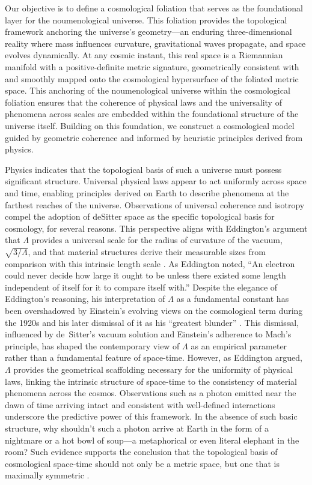 \documentclass[aps,rmp,groupedaddress,twocolumn,10pt]{revtex4-2}
\begin{document}
Our objective is to define a cosmological foliation that serves as the foundational layer for the noumenological universe. This foliation provides the topological framework anchoring the universe's geometry---an enduring three-dimensional reality where mass influences curvature, gravitational waves propagate, and space evolves dynamically. At any cosmic instant, this real space is a Riemannian manifold with a positive-definite metric signature, geometrically consistent with and smoothly mapped onto the cosmological hypersurface of the foliated metric space. This anchoring of the noumenological universe within the cosmological foliation ensures that the coherence of physical laws and the universality of phenomena across scales are embedded within the foundational structure of the universe itself. Building on this foundation, we construct a cosmological model guided by geometric coherence and informed by heuristic principles derived from physics.

Physics indicates that the topological basis of such a universe must possess significant structure. Universal physical laws appear to act uniformly across space and time, enabling principles derived on Earth to describe phenomena at the farthest reaches of the universe. Observations of universal coherence and isotropy compel the adoption of deSitter space as the specific topological basis for cosmology, for several reasons. This perspective aligns with Eddington's argument that $\Lambda$ provides a universal scale for the radius of curvature of the vacuum, $\sqrt{3/\Lambda}$, and that material structures derive their measurable sizes from comparison with this intrinsic length scale \cite{Eddington1923}. As Eddington noted, ``An electron could never decide how large it ought to be unless there existed some length independent of itself for it to compare itself with.'' Despite the elegance of Eddington's reasoning, his interpretation of $\Lambda$ as a fundamental constant has been overshadowed by Einstein's evolving views on the cosmological term during the 1920s and his later dismissal of it as his ``greatest blunder'' \cite{Janzen2014}. This dismissal, influenced by de~Sitter's vacuum solution and Einstein's adherence to Mach's principle, has shaped the contemporary view of $\Lambda$ as an empirical parameter rather than a fundamental feature of space-time. However, as Eddington argued, $\Lambda$ provides the geometrical scaffolding necessary for the uniformity of physical laws, linking the intrinsic structure of space-time to the consistency of material phenomena across the cosmos. Observations such as a photon emitted near the dawn of time arriving intact and consistent with well-defined interactions underscore the predictive power of this framework. In the absence of such basic structure, why shouldn't such a photon arrive at Earth in the form of a nightmare or a hot bowl of soup---a metaphorical or even literal elephant in the room? Such evidence supports the conclusion that the topological basis of cosmological space-time should not only be a metric space, but one that is maximally symmetric \cite{Janzen2012}.
\end{document}
